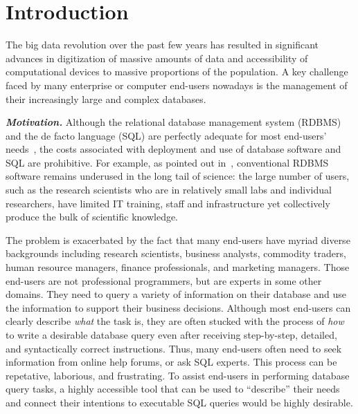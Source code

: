 \section{Introduction}
\label{sec:introduction}


The big data revolution over the past few years has resulted
in significant advances in digitization of massive amounts
of data and accessibility of computational devices to massive
proportions of the population. A key challenge faced by many
enterprise or computer end-users nowadays is the management
of their increasingly large and complex databases.




\vspace{1mm}
\noindent \textbf{\textit{Motivation.}}
Although the relational database management system (RDBMS) and the
de facto language (SQL) are perfectly adequate for most end-users'
needs~\cite{Howe:2011}, the costs associated with deployment and
use of database software and SQL are prohibitive. 
For example, as pointed out in~\cite{Gray:2005},
conventional RDBMS software remains underused
in the long tail of science: the large number of users, such as the
research scientists who are in relatively small labs and individual
researchers, have limited IT training, staff and infrastructure yet
collectively produce the bulk of scientific knowledge. 

The problem is exacerbated by the fact that many end-users
have myriad diverse backgrounds including research scientists,
business analysts, commodity traders, human resource managers,
finance professionals, and marketing managers. 
Those end-users are not professional programmers, but are experts in some
other domains. They need to query a variety of information on their
database and use the information to support their business decisions.
Although most end-users can clearly describe \textit{what} the task is, they
are often stucked with the process of \textit{how} to
write a desirable database query even after
receiving step-by-step, detailed,
and syntactically correct instructions.
Thus, many end-users often need to
seek information from online help forums, or ask
SQL experts. This process can be repetative, laborious, and frustrating.
To assist end-users in performing database query tasks,
a highly accessible tool that can be used to ``describe''
their needs and connect their intentions to executable
SQL queries would be highly desirable.

